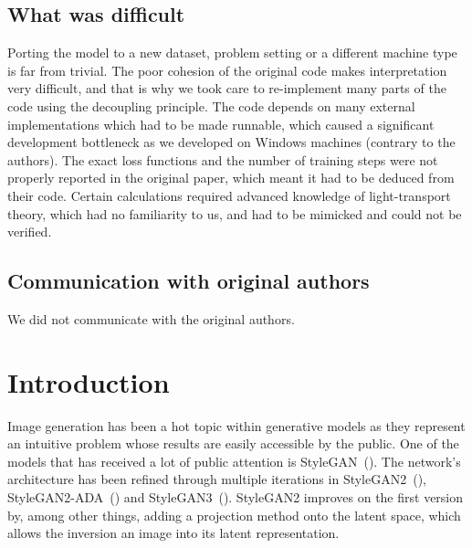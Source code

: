 \subsection*{What was difficult}
Porting the model to a new dataset, problem setting or a different machine type is far from trivial. The poor cohesion of the original code makes interpretation very difficult, and that is why we took care to re-implement many parts of the code using the decoupling principle. The code depends on many external implementations which had to be made runnable, which caused a significant development bottleneck as we developed on Windows machines (contrary to the authors). The exact loss functions and the number of training steps were not properly reported in the original paper, which meant it had to be deduced from their code. Certain calculations required advanced knowledge of light-transport theory, which had no familiarity to us, and had to be mimicked and could not be verified.


\subsection*{Communication with original authors}
We did not communicate with the original authors.
\newpage
\section{Introduction}
Image generation has been a hot topic within generative models as they represent an intuitive problem whose results are easily accessible by the public. One of the models that has received a lot of public attention is StyleGAN~(\cite{stylegan}). 
The network's architecture has been refined through multiple iterations in StyleGAN2~(\cite{stylegan2}), StyleGAN2-ADA~(\cite{stylegan2-ada}) and StyleGAN3~(\cite{stylegan3}). StyleGAN2 improves on the first version by, among other things, adding a projection method onto the latent space, which allows the inversion an image into its latent representation. 

